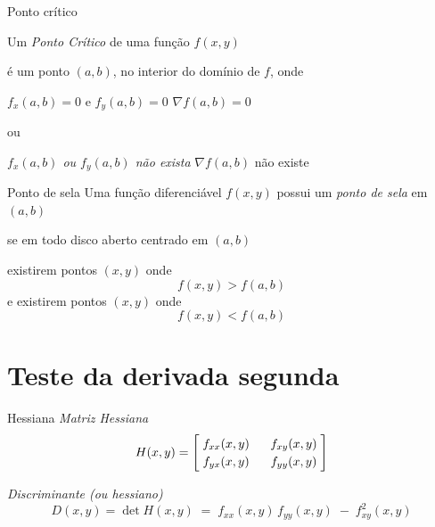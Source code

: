 \begin{frame}{Ponto crítico}

  Um \emph{Ponto Crítico} de uma função \(f(x, y)\)

  \pause
  \vspace{0.1\baselineskip}
  é um ponto $(a, b)$, no interior do domínio de $f$, onde

  \pause
  \vspace{0.1\baselineskip}
  \emph{\(f_x(a, b) = 0\)} e \emph{\(f_y(a, b) =0\)  }
  \pause
  \tabto{70mm}
  \(\nabla f(a, b) = 0\)

  \pause
  \vspace{0.1\baselineskip}
  ou

  \emph{\(f_x(a, b)\) ou \(f_y(a, b)\) não exista}
  \pause
  \tabto{70mm}
  \(\nabla f(a, b)\) não existe

\end{frame}

\begin{frame}{Ponto de sela}
  Uma função diferenciável \(f(x, y)\) possui um \emph{ponto de sela} em \((a, b)\)

  \pause
  \vspace{0.1\baselineskip}
  se em todo disco aberto centrado em \((a, b)\)

  \pause
  \vspace{0.1\baselineskip}
  existirem pontos \((x, y)\) onde
  \[
    f(x, y) > f(a, b)
  \]
  \pause
  e existirem pontos \((x, y)\) onde
  \[
    f(x, y) < f(a, b)
  \]
\end{frame}



\section{Teste da derivada segunda}

\begin{frame}{Hessiana}
  \emph{Matriz Hessiana}
  \[
    \arraycolsep=2mm
    \def\arraystretch{1.2}
    H(x, y) = \begin{bmatrix}
      \null\;f_{xx}(x, y)\;\null & \null\;f_{xy}(x, y)\;\null \\
      f_{yx}(x, y) & f_{yy}(x, y)
    \end{bmatrix}
  \]

  \pause
  \vspace{\baselineskip}
  \emph{Discriminante (ou hessiano)}
  \[
    D(x, y) = \det H(x, y) \;=\; f_{xx}(x, y)\,f_{yy}(x, y) \;-\; f_{xy}^2(x, y)
  \]
\end{frame}

